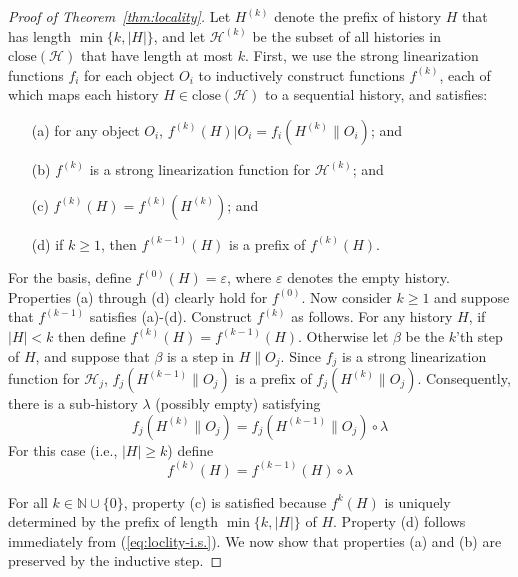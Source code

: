 \documentclass[11pt,letterpaper]{article}
\newcommand{\paren}[1]{{\left({#1}\right)}}
\newcommand{\HH}{\mathcal{H}}
\newcommand{\IIN}{\mathds{N}}
\newcommand{\close}[1]{\ensuremath{\text{close}\left(#1\right)}}
\newcommand{\obj}{\ensuremath{\mathit{O}}}
\begin{document}
\begin{proof}[Proof of Theorem~\ref{thm:locality}]
Let $H^{(k)}$ denote the prefix of history $H$ that has length $\min\{k,|H|\}$, and
let $\HH^{(k)}$ be the subset of all histories in $\close{\HH}$ that have length at most $k$.
First, we use the strong linearization functions $f_i$ for each object $\obj_i$ to
inductively construct functions $f^{(k)}$,
each of which maps each history $H \in \close{\HH}$ to a sequential history, and satisfies:
\begin{enumerate}
 \item[(a)] for any object $\obj_i$, $f^{(k)}(H)|O_i = f_i(H^{(k)}\|O_i)$; and
 \item[(b)] $f^{(k)}$ is a strong linearization function for $\HH^{(k)}$; and
 \item[(c)] $f^{(k)}(H)=f^{(k)}(H^{(k)})$; and
 \item[(d)] if $k\geq 1$, then $f^{(k-1)}(H)$ is a prefix of $f^{(k)}(H)$.
\end{enumerate}

For the basis, define $f^{(0)}(H)=\varepsilon$, where $\varepsilon$ denotes the empty history.
Properties (a) through (d) clearly hold for $f^{(0)}$.
Now consider $k\geq 1$ and suppose that $f^{(k-1)}$ satisfies (a)-(d).
Construct $f^{(k)}$ as follows.
For any history $H$, if $|H| < k$ then define $f^{(k)}(H) = f^{(k-1)}(H)$.
Otherwise let $\beta$ be the $k$'th step of $H$, and suppose that $\beta$ is a step in $H\|\obj_j$.
Since $f_j$ is a strong linearization function for $\HH_j$,
$f_j\paren{H^{(k-1)}\|O_j}$ is a prefix of $f_j\paren{H^{(k)}\|O_j}$.
Consequently, there is a sub-history $\lambda$ (possibly empty) satisfying
\begin{equation}\label{eq:def_lambda}
  f_j\paren{H^{(k)}\|O_j}=f_j\paren{H^{(k-1)}\|O_j}\circ\lambda
\end{equation}
For this case (i.e., $|H| \geq k$) define
\begin{equation}\label{eq:loclity-i.s.}
  f^{(k)}(H)=f^{(k-1)}(H)\circ\lambda
\end{equation}

For all $k \in \IIN \cup \{0\}$,
property (c) is satisfied because $f^{k}(H)$ is uniquely determined by the prefix of length $\min\{k,|H|\}$ of $H$.
Property (d) follows immediately from (\ref{eq:loclity-i.s.}).
We now show that properties (a) and (b) are preserved by the inductive step.


\end{proof}
\end{document}
